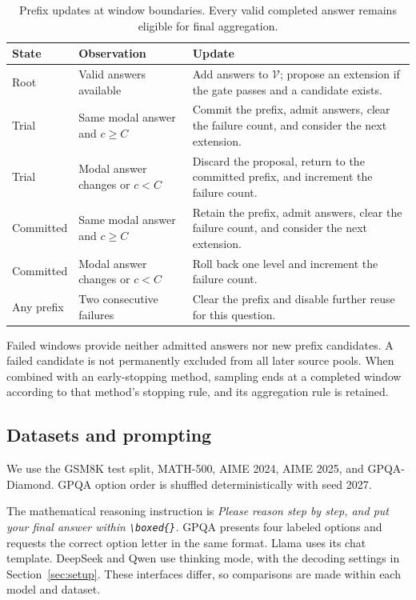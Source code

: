\begin{table}[!htbp]
\centering\small
\caption{Prefix updates at window boundaries. Every valid completed answer remains eligible for final aggregation.}
\label{tab:state_transitions}
\begin{tabularx}{\linewidth}{@{}lXX@{}}
\toprule
State & Observation & Update\\
\midrule
Root & Valid answers available & Add answers to $\mathcal V$; propose an extension if the gate passes and a candidate exists.\\
Trial & Same modal answer and $c\geq C$ & Commit the prefix, admit answers, clear the failure count, and consider the next extension.\\
Trial & Modal answer changes or $c<C$ & Discard the proposal, return to the committed prefix, and increment the failure count.\\
Committed & Same modal answer and $c\geq C$ & Retain the prefix, admit answers, clear the failure count, and consider the next extension.\\
Committed & Modal answer changes or $c<C$ & Roll back one level and increment the failure count.\\
Any prefix & Two consecutive failures & Clear the prefix and disable further reuse for this question.\\
\bottomrule
\end{tabularx}
\end{table}

Failed windows provide neither admitted answers nor new prefix candidates. A failed candidate is not permanently excluded from all later source pools. When combined with an early-stopping method, sampling ends at a completed window according to that method's stopping rule, and its aggregation rule is retained.

\subsection{Datasets and prompting}
We use the GSM8K test split, MATH-500, AIME 2024, AIME 2025, and GPQA-Diamond. GPQA option order is shuffled deterministically with seed 2027.

The mathematical reasoning instruction is \emph{Please reason step by step, and put your final answer within \texttt{\textbackslash boxed\{\}}.} GPQA presents four labeled options and requests the correct option letter in the same format. Llama uses its chat template. DeepSeek and Qwen use thinking mode, with the decoding settings in Section~\ref{sec:setup}. These interfaces differ, so comparisons are made within each model and dataset.

